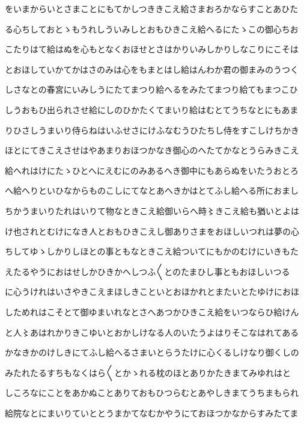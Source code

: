 \documentclass[a4paper,11pt,landscape]{ltjtarticle}
\begin{document}
\par\medskip
をいまからいとさまことにもてかしつききこえ給さまおろかならすことあひた
\par\medskip
る心ちしておとゝもうれしういみしとおもひきこえ給へるにたゝこの御心ちお
\par\medskip
こたりはて給はぬを心もとなくおほせとさはかりいみしかりしなこりにこそは
\par\medskip
とおほしていかてかはさのみは心をもまとはし給はんわか君の御まみのうつく
\par\medskip
しさなとの春宮にいみしうにたてまつり給へるをみたてまつり給てもまつこひ
\par\medskip
しうおもひ出られさせ給にしのひかたくてまいり給はむとてうちなとにもあま
\par\medskip
りひさしうまいり侍らねはいふせさにけふなむうひたちし侍をすこしけちかき
\par\medskip
ほとにてきこえさせはやあまりおほつかなき御心のへたてかなとうらみきこえ
\par\medskip
給へれはけにたゝひとへにえむにのみあるへき御中にもあらぬをいたうおとろ
\par\medskip
へ給へりといひなからものこしにてなとあへきかはとてふし給へる所におまし
\par\medskip
ちかうまいりたれはいりて物なときこえ給御いらへ時〻きこえ給も猶いとよは
\par\medskip
け也されとむけになき人とおもひきこえし御ありさまをおほしいつれは夢の心
\par\medskip
ちしてゆゝしかりしほとの事ともなときこえ給ついてにもかのむけにいきもた
\par\medskip
えたるやうにおはせしかひきかへしつふ〱とのたまひし事ともおほしいつる
\par\medskip
に心うけれはいさやきこえまほしきこといとおほかれとまたいとたゆけにおほ
\par\medskip
しためれはこそとて御ゆまいれなとさへあつかひきこえ給をいつならひ給けん
\par\medskip
と人〻あはれかりきこゆいとおかしけなる人のいたうよはりそこなはれてある
\par\medskip
かなきかのけしきにてふし給へるさまいとらうたけに心くるしけなり御くしの
\par\medskip
みたれたるすちもなくはら〱とかゝれる枕のほとありかたきまてみゆれはと
\par\medskip
しころなにことをあかぬことありておもひつらむとあやしきまてうちまもられ
\par\medskip
給院なとにまいりていととうまかてなむかやうにておほつかなからすみたてま
\end{document}
